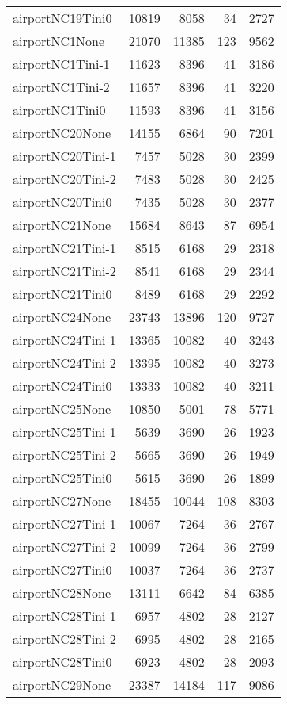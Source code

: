 \begin{longtable}{lrrrr}
airportNC19Tini0 & 10819 & 8058 & 34 & 2727 \\
airportNC1None & 21070 & 11385 & 123 & 9562 \\
airportNC1Tini-1 & 11623 & 8396 & 41 & 3186 \\
airportNC1Tini-2 & 11657 & 8396 & 41 & 3220 \\
airportNC1Tini0 & 11593 & 8396 & 41 & 3156 \\
airportNC20None & 14155 & 6864 & 90 & 7201 \\
airportNC20Tini-1 & 7457 & 5028 & 30 & 2399 \\
airportNC20Tini-2 & 7483 & 5028 & 30 & 2425 \\
airportNC20Tini0 & 7435 & 5028 & 30 & 2377 \\
airportNC21None & 15684 & 8643 & 87 & 6954 \\
airportNC21Tini-1 & 8515 & 6168 & 29 & 2318 \\
airportNC21Tini-2 & 8541 & 6168 & 29 & 2344 \\
airportNC21Tini0 & 8489 & 6168 & 29 & 2292 \\
airportNC24None & 23743 & 13896 & 120 & 9727 \\
airportNC24Tini-1 & 13365 & 10082 & 40 & 3243 \\
airportNC24Tini-2 & 13395 & 10082 & 40 & 3273 \\
airportNC24Tini0 & 13333 & 10082 & 40 & 3211 \\
airportNC25None & 10850 & 5001 & 78 & 5771 \\
airportNC25Tini-1 & 5639 & 3690 & 26 & 1923 \\
airportNC25Tini-2 & 5665 & 3690 & 26 & 1949 \\
airportNC25Tini0 & 5615 & 3690 & 26 & 1899 \\
airportNC27None & 18455 & 10044 & 108 & 8303 \\
airportNC27Tini-1 & 10067 & 7264 & 36 & 2767 \\
airportNC27Tini-2 & 10099 & 7264 & 36 & 2799 \\
airportNC27Tini0 & 10037 & 7264 & 36 & 2737 \\
airportNC28None & 13111 & 6642 & 84 & 6385 \\
airportNC28Tini-1 & 6957 & 4802 & 28 & 2127 \\
airportNC28Tini-2 & 6995 & 4802 & 28 & 2165 \\
airportNC28Tini0 & 6923 & 4802 & 28 & 2093 \\
airportNC29None & 23387 & 14184 & 117 & 9086 \\

\end{longtable}
